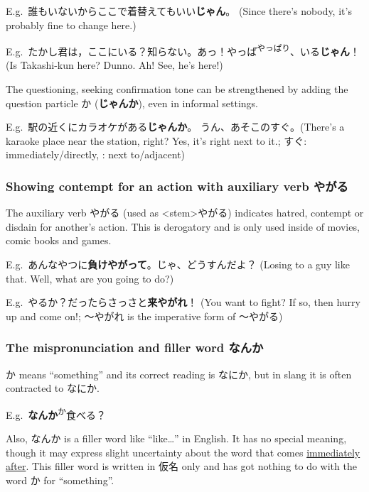 \documentclass[../nihongo-gakushuu-kyouzai-grammar.tex]{subfiles}
\begin{document}
E.g.\ 誰もいないからここで着替えてもいい\textbf{じゃん}。 (Since there's nobody, it's probably fine to change here.)

E.g.\ たかし君は，ここにいる？知らない。あっ！やっぱ\textsuperscript{やっぱり}、いる\textbf{じゃん}！ (Is Takashi-kun here? Dunno. Ah! See, he's here!)

The questioning, seeking confirmation tone can be strengthened by adding the question particle か (\textbf{じゃんか}), even in informal settings.

E.g.\ 駅の近くにカラオケがある\textbf{じゃんか}。 うん、あそこのすぐ。(There's a karaoke place near the station, right? Yes, it's right next to it.; すぐ: immediately/directly, : next to/adjacent)


\subsubsection{Showing contempt for an action with auxiliary verb やがる}
The auxiliary verb やがる (used as <stem>やがる) indicates hatred, contempt or disdain for another's action. This is derogatory and is only used inside of movies, comic books and games.

E.g.\ あんなやつに\textbf{負けやがって}。じゃ、どうすんだよ？ (Losing to a guy like that. Well, what are you going to do?)

E.g.\ やるか？だったらさっさと\textbf{来やがれ}！ (You want to fight? If so, then hurry up and come on!; 〜やがれ is the imperative form of 〜やがる)


\subsubsection{The  mispronunciation and filler word なんか}

か means ``something'' and its correct reading is  なにか, but in slang it is often contracted to なにか.

E.g.\ \textbf{なんか}\textsuperscript{か}食べる？

Also, なんか is a filler word like ``like\dots'' in English. It has no special meaning, though it may express slight uncertainty about the word that comes \ul{immediately after}. This filler word is written in 仮名 only and has got nothing to do with the word か for ``something''.
\end{document}
